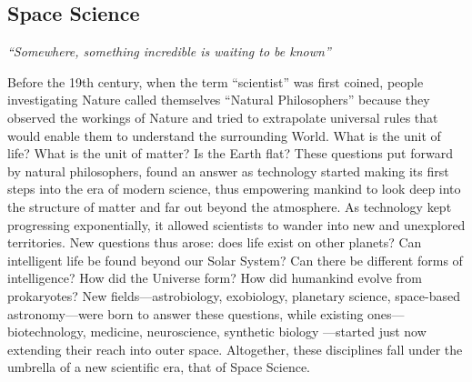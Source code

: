 \documentclass[letter,11pt]{article}
\newcommand{\attrib}[1]{\nopagebreak{\raggedleft\footnotesize #1\par}}
\begin{document}

\subsection{Space Science}
\label{ps-space-science}
\begin{center}
\em ``Somewhere, something incredible is waiting to be known''
\end{center}
\attrib{\textbf{-- Carl Sagan\index{Sagan, Carl}}}

Before the 19th century, when the term ``scientist'' was first coined, people
investigating Nature called themselves ``Natural Philosophers'' because they
observed the workings of Nature and tried to extrapolate universal rules that
would enable them to understand the surrounding World. What is the unit of
life? What is the unit of matter? Is the Earth flat? These questions put
forward by natural philosophers, found an answer as technology started making
its first steps into the era of modern science, thus empowering mankind to look
deep into the structure of matter and far out beyond the atmosphere. As
technology kept progressing exponentially, it allowed scientists to wander into
new and unexplored territories. New questions thus arose: does life exist on
other planets? Can intelligent life be found beyond our Solar System? Can there
be different forms of intelligence? How did the Universe form? How did
humankind evolve from prokaryotes? New fields---astrobiology, exobiology,
planetary science, space-based astronomy---were born to answer these questions,
while existing ones---biotechnology, medicine, neuroscience, synthetic biology%
---started just now extending their reach into outer space. Altogether, these
disciplines fall under the umbrella of a new scientific era, that of Space
Science.  
\end{document}
